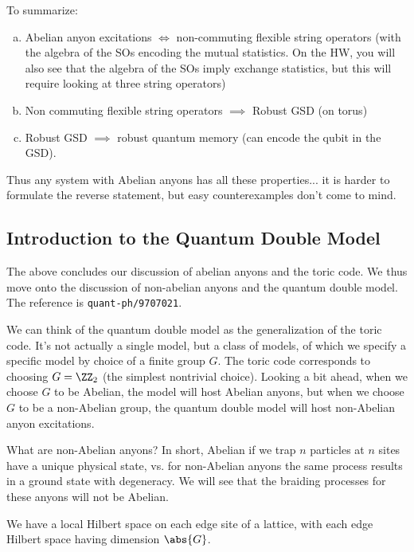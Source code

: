 To summarize:
\begin{enumerate}[(a)]
    \item Abelian anyon excitations $\iff$ non-commuting flexible string operators (with the algebra of the SOs encoding the mutual statistics. On the HW, you will also see that the algebra of the SOs imply exchange statistics, but this will require looking at three string operators)
    \item Non commuting flexible string operators $\implies$ Robust GSD (on torus)
    \item Robust GSD $\implies$ robust quantum memory (can encode the qubit in the GSD).
\end{enumerate}
Thus any system with Abelian anyons has all these properties... it is harder to formulate the reverse statement, but easy counterexamples don't come to mind.

\subsection{Introduction to the Quantum Double Model}
The above concludes our discussion of abelian anyons and the toric code. We thus move onto the discussion of non-abelian anyons and the quantum double model. The reference is \texttt{quant-ph/9707021}. 

We can think of the quantum double model as the generalization of the toric code. It's not actually a single model, but a class of models, of which we specify a specific model by choice of a finite group $G$. The toric code corresponds to choosing $G = \ZZ_2$ (the simplest nontrivial choice). Looking a bit ahead, when we choose $G$ to be Abelian, the model will host Abelian anyons, but when we choose $G$ to be a non-Abelian group, the quantum double model will host non-Abelian anyon excitations.

What are non-Abelian anyons? In short, Abelian if we trap $n$ particles at $n$ sites have a unique physical state, vs. for non-Abelian anyons the same process results in a ground state with degeneracy. We will see that the braiding processes for these anyons will not be Abelian.

We have a local Hilbert space on each edge site of a lattice, with each edge Hilbert space having dimension $\abs{G}$. 

